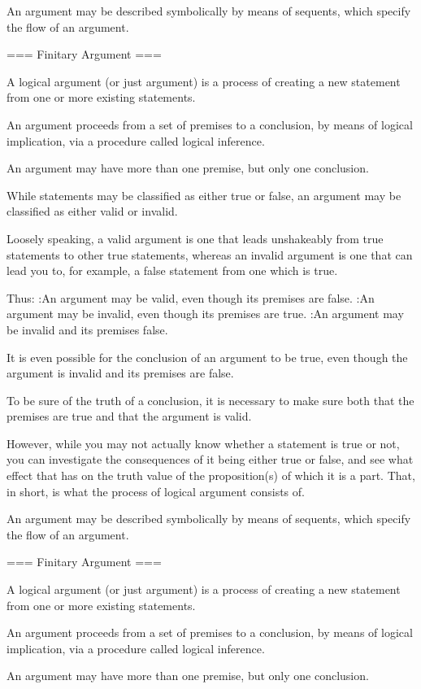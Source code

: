 An argument may be described symbolically by means of sequents, which specify the flow of an argument.


=== Finitary Argument ===

A logical argument (or just argument) is a process of creating a new statement from one or more existing statements.

An argument proceeds from a set of premises to a conclusion, by means of logical implication, via a procedure called logical inference.


An argument may have more than one premise, but only one conclusion.


While statements may be classified as either true or false, an argument may be classified as either valid or invalid.


Loosely speaking, a valid argument is one that leads unshakeably from true statements to other true statements, whereas an invalid argument is one that can lead you to, for example, a false statement from one which is true.


Thus:
:An argument may be valid, even though its premises are false.
:An argument may be invalid, even though its premises are true.
:An argument may be invalid and its premises false.

It is even possible for the conclusion of an argument to be true, even though the argument is invalid and its premises are false.


To be sure of the truth of a conclusion, it is necessary to make sure both that the premises are true and that the argument is valid.


However, while you may not actually know whether a statement is true or not, you can investigate the consequences of it being either true or false, and see what effect that has on the truth value of the proposition(s) of which it is a part. That, in short, is what the process of logical argument consists of.


An argument may be described symbolically by means of sequents, which specify the flow of an argument.


=== Finitary Argument ===

A logical argument (or just argument) is a process of creating a new statement from one or more existing statements.

An argument proceeds from a set of premises to a conclusion, by means of logical implication, via a procedure called logical inference.


An argument may have more than one premise, but only one conclusion.


